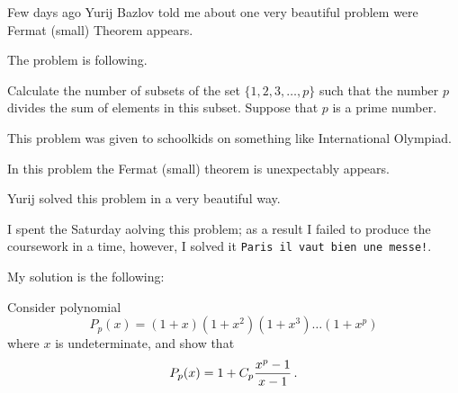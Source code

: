 

  Few days ago Yurij Bazlov told me about one very beautiful problem
   were Fermat (small)  Theorem appears.

   The problem is following. 

Calculate the number 
of subsets of the set $\{1,2,3,\dots, p\}$
such that the number $p$ divides the sum of elements in this subset. 
Suppose that $p$ is a prime number.


 This problem  was given to schoolkids on something like 
International Olympiad.

In this problem the Fermat (small) theorem is unexpectably appears.

   Yurij solved this problem in a very beautiful way.

I spent the Saturday aolving this problem; as a result I failed
to produce the coursework in a time, however,
 I solved it {\tt Paris il vaut bien une messe!}.

My solution is the following:

   Consider polynomial
           $$
  P_p(x)=(1+x)(1+x^2)(1+x^3)\dots (1+x^p)
           $$
where $x$ is undeterminate, and show that
           $$
  P_p(x)=1+C_p{x^{p}-1\over x-1}\,.
           $$

\bye
\bye
